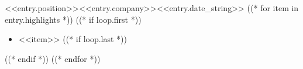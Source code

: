\begin{cvsubsection}{<<entry.position>>}{<<entry.company>>}{<<entry.date_string>>}	
((* for item in entry.highlights *))
    ((* if loop.first *))
    \begin{itemize}
    ((* endif *))
        \item <<item>>
    ((* if loop.last *))
    \end{itemize}
    ((* endif *))
((* endfor *))
\end{cvsubsection}